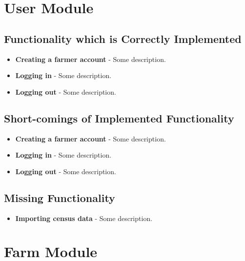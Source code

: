 \documentclass[11pt,fleqn]{book} %
\begin{document}

\chapter{User Module}
	\section{Functionality which is Correctly Implemented}
		\begin{itemize}
			\item\textbf{Creating a farmer account} -
			Some description. 
			
			\item\textbf{Logging in} -
			Some description.
			
			\item\textbf{Logging out} -
			Some description.
		\end{itemize}
	\section{Short-comings of Implemented Functionality}
		\begin{itemize}
			\item\textbf{Creating a farmer account} -
			Some description. 
			
			\item\textbf{Logging in} -
			Some description.
			
			\item\textbf{Logging out} -
			Some description.
		\end{itemize}
	\section{Missing Functionality}
		\begin{itemize}
			\item\textbf{Importing census data} -
			Some description. 
		\end{itemize}


\chapter{Farm Module}
\end{document}
